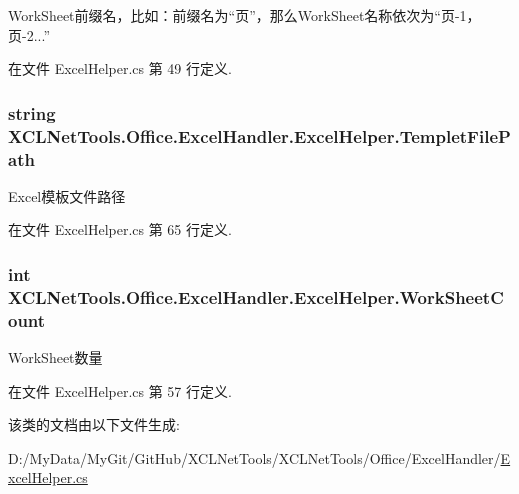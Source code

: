 Work\-Sheet前缀名，比如：前缀名为“页”，那么\-Work\-Sheet名称依次为“页-\/1，页-\/2...” 



在文件 Excel\-Helper.\-cs 第 49 行定义.

\hypertarget{class_x_c_l_net_tools_1_1_office_1_1_excel_handler_1_1_excel_helper_a5ea43ea5bce7424c7ad90335ddeb09bd}{
\subsubsection[{Templet\-File\-Path}]{\setlength{\rightskip}{0pt plus 5cm}string X\-C\-L\-Net\-Tools.\-Office.\-Excel\-Handler.\-Excel\-Helper.\-Templet\-File\-Path\hspace{0.3cm}{\ttfamily [set]}}}\label{class_x_c_l_net_tools_1_1_office_1_1_excel_handler_1_1_excel_helper_a5ea43ea5bce7424c7ad90335ddeb09bd}


Excel模板文件路径 



在文件 Excel\-Helper.\-cs 第 65 行定义.

\hypertarget{class_x_c_l_net_tools_1_1_office_1_1_excel_handler_1_1_excel_helper_a2354740ddfdb8dbef974f91258c672e0}{
\subsubsection[{Work\-Sheet\-Count}]{\setlength{\rightskip}{0pt plus 5cm}int X\-C\-L\-Net\-Tools.\-Office.\-Excel\-Handler.\-Excel\-Helper.\-Work\-Sheet\-Count\hspace{0.3cm}{\ttfamily [get]}}}\label{class_x_c_l_net_tools_1_1_office_1_1_excel_handler_1_1_excel_helper_a2354740ddfdb8dbef974f91258c672e0}


Work\-Sheet数量 



在文件 Excel\-Helper.\-cs 第 57 行定义.



该类的文档由以下文件生成\-:\begin{DoxyCompactItemize}
\item 
D\-:/\-My\-Data/\-My\-Git/\-Git\-Hub/\-X\-C\-L\-Net\-Tools/\-X\-C\-L\-Net\-Tools/\-Office/\-Excel\-Handler/\hyperlink{_excel_helper_8cs}{Excel\-Helper.\-cs}\end{DoxyCompactItemize}
